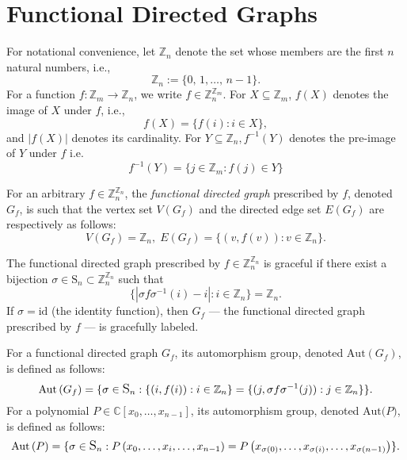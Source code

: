 \section{Functional Directed Graphs}\label{sec:Functional Directed Graphs}
For notational convenience, let $\mathbb{Z}_{n}$ denote the set whose members are the first $n$ natural numbers, i.e.,
\begin{equation}
\mathbb{Z}_{n}:=\big\{0,\,1,\ldots,\,n-1\big\}.
\end{equation}
For a function $f:\mathbb{Z}_{m}\to\mathbb{Z}_{n}$, we write $f\in\mathbb{Z}_{n}^{\mathbb{Z}_{m}}$.
For $X\subseteq\mathbb{Z}_{m}$, $f(X)$ denotes the image of $X$
under $f$, i.e.,
\begin{equation}
f(X)=\{f(i):i\in X\},
\end{equation}
and $|f(X)|$ denotes its
cardinality. For $Y\subseteq\mathbb{Z}_{n}\ensuremath{,}f^{-1}(Y)$
denotes the pre-image of $Y$ under $f$ i.e.
\begin{equation}
f^{-1}(Y)=\{j\in\mathbb{Z}_{m}:f(j)\in Y\}
\end{equation}
\begin{definition}\label{defn:functional-directed-graphs}
For an arbitrary $f\in \mathbb{Z}_n^{\mathbb{Z}_n}$, the \emph{functional directed graph} prescribed by $f$, denoted $G_f$, is such that the vertex set $V(G_f)$ and the directed edge set $E(G_f)$ are respectively as follows:
\[
V(G_f) = \mathbb{Z}_n, \; E(G_f) = \{(v,f(v)):v \in \mathbb{Z}_n\}.
\]
\end{definition}
\begin{definition}\label{defn:graceful-functional-graphs}
The functional directed graph prescribed by $f\in\mathbb{Z}_{n}^{\mathbb{Z}_{n}}$ is graceful if there exist
a bijection $\sigma\in \text{S}_n \subset
 \mathbb{Z}_{n}^{\mathbb{Z}_{n}}$ such that
\begin{equation}
\big\{\left|\sigma f\sigma^{-1}(i)-i\right|:i\in\mathbb{Z}_{n}\big\}=\mathbb{Z}_{n}.
\end{equation}
If $\sigma=\text{id}$ (the identity function), then $G_{f}$ --- the functional directed graph prescribed by $f$ --- is gracefully labeled. 
\end{definition}
\begin{defn}\label{defn:aut-functional-graphs}
For a functional directed graph $G_f$, its automorphism group, denoted $\text{Aut}\left(G_f\right)$, is defined as follows:
\[
\text{Aut}\left(G_f\right) = \large\{\sigma \in \text{S}_n : \{(i, f(i)): i \in \mathbb{Z}_n \} = \{(j, \sigma f \sigma^{-1} (j)) : j \in \mathbb{Z}_n\}\large\}. 
\]
For a polynomial $P \in \mathbb{C}[x_0, \ldots, x_{n-1}]$, its automorphism group, denoted $\text{Aut($P$)}$, is defined as follows:
\[
\text{Aut}\left(P\right)=\large\{\sigma\in\text{S}_{n}:P\left(x_{0},\ldots,x_{i},\ldots,x_{n-1}\right)=P\left(x_{\sigma(0)},\ldots,x_{\sigma(i)},\ldots,x_{\sigma(n-1)}\right)\large\}.
\]
\end{defn}
